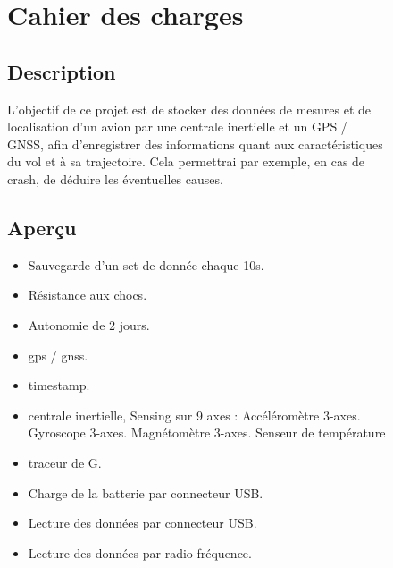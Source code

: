 \begin{figure}
	
	\hfill
	
	
	\begin{minipage}{1\textwidth}
		\section{Cahier des charges}
		
		\subsection{Description}
		L'objectif de ce projet est de stocker des données de mesures et de localisation d'un avion par une centrale inertielle et un GPS / GNSS, afin d'enregistrer des informations quant aux caractéristiques du vol et à sa trajectoire. Cela permettrai par exemple, en cas de crash, de déduire les éventuelles causes. 
	\end{minipage} \vspace{+4mm}
	
	\begin{minipage}{1\textwidth}
		
		\subsection{Aperçu}
		\begin{itemize}
			\item	Sauvegarde d’un set de donnée chaque 10s.
			\item	Résistance aux chocs.
			\item	Autonomie de 2 jours.
			\item	\gls{gps} / \gls{gnss}.
			\item	\gls{timestamp}.
			\item	\gls{centrale inertielle}, Sensing sur 9 axes :
			\subitem Accéléromètre 3-axes. 
			\subitem	Gyroscope 3-axes.
			\subitem	Magnétomètre 3-axes. 
			\subitem	Senseur de température
			\item \gls{traceur de G}.
			\item Charge de la batterie par connecteur USB.
			\item Lecture des données par connecteur USB.
			\item Lecture des données par radio-fréquence.
		\end{itemize}
		
		
	\end{minipage}
	
\end{figure}


